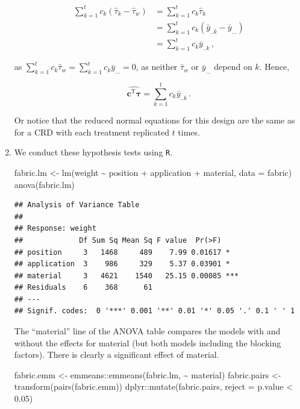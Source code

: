 \documentclass[
]{book}
\newenvironment{Shaded}{\begin{snugshade}}{\end{snugshade}}
\newcommand{\AttributeTok}[1]{\textcolor[rgb]{0.77,0.63,0.00}{#1}}
\newcommand{\FloatTok}[1]{\textcolor[rgb]{0.00,0.00,0.81}{#1}}
\newcommand{\FunctionTok}[1]{\textcolor[rgb]{0.00,0.00,0.00}{#1}}
\newcommand{\NormalTok}[1]{#1}
\newcommand{\OtherTok}[1]{\textcolor[rgb]{0.56,0.35,0.01}{#1}}
\newcommand{\SpecialCharTok}[1]{\textcolor[rgb]{0.00,0.00,0.00}{#1}}
\theoremstyle{definition}
\theoremstyle{definition}
\theoremstyle{definition}
\theoremstyle{definition}
\theoremstyle{remark}
\begin{document}
\begin{enumerate}
  \begin{align*}
   \sum_{k=1}^tc_k\left(\hat{\tau}_k - \hat{\tau}_w\right) & = \sum_{k=1}^tc_k\hat{\tau}_k \\
   & = \sum_{k=1}^tc_k\left(\bar{y}_{..k} - \bar{y}_{...}\right) \\
   & = \sum_{k=1}^tc_k\bar{y}_{..k}\,,
   \end{align*}

  as \(\sum_{k=1}^tc_k\hat{\tau}_w = \sum_{k=1}^tc_k\bar{y}_{...} = 0\), as neither \(\hat{\tau}_w\) or \(\bar{y}_{...}\) depend on \(k\). Hence,

  \[
   \widehat{\boldsymbol{c}^{\mathrm{T}}\boldsymbol{\tau}} = \sum_{k=1}^tc_k\bar{y}_{..k}\,.
   \]

  Or notice that the reduced normal equations for this design are the same as for a CRD with each treatment replicated \(t\) times.
\item
  We conduct these hypothesis tests using \texttt{R}.

\begin{Shaded}
\begin{Highlighting}[]
\NormalTok{fabric.lm }\OtherTok{\textless{}{-}} \FunctionTok{lm}\NormalTok{(weight }\SpecialCharTok{\textasciitilde{}}\NormalTok{ position }\SpecialCharTok{+}\NormalTok{ application }\SpecialCharTok{+}\NormalTok{ material, }\AttributeTok{data =}\NormalTok{ fabric)}
\FunctionTok{anova}\NormalTok{(fabric.lm)}
\end{Highlighting}
\end{Shaded}

\begin{verbatim}
## Analysis of Variance Table
## 
## Response: weight
##             Df Sum Sq Mean Sq F value  Pr(>F)    
## position     3   1468     489    7.99 0.01617 *  
## application  3    986     329    5.37 0.03901 *  
## material     3   4621    1540   25.15 0.00085 ***
## Residuals    6    368      61                    
## ---
## Signif. codes:  0 '***' 0.001 '**' 0.01 '*' 0.05 '.' 0.1 ' ' 1
\end{verbatim}

  The ``material'' line of the ANOVA table compares the models with and without the effects for material (but both models including the blocking factors). There is clearly a significant effect of material.

\begin{Shaded}
\begin{Highlighting}[]
\NormalTok{fabric.emm }\OtherTok{\textless{}{-}}\NormalTok{ emmeans}\SpecialCharTok{::}\FunctionTok{emmeans}\NormalTok{(fabric.lm, }\SpecialCharTok{\textasciitilde{}}\NormalTok{ material)}
\NormalTok{fabric.pairs }\OtherTok{\textless{}{-}} \FunctionTok{transform}\NormalTok{(}\FunctionTok{pairs}\NormalTok{(fabric.emm))}
\NormalTok{dplyr}\SpecialCharTok{::}\FunctionTok{mutate}\NormalTok{(fabric.pairs, }\AttributeTok{reject =}\NormalTok{ p.value }\SpecialCharTok{\textless{}} \FloatTok{0.05}\NormalTok{)}
\end{Highlighting}
\end{Shaded}


\end{enumerate}
\end{document}
